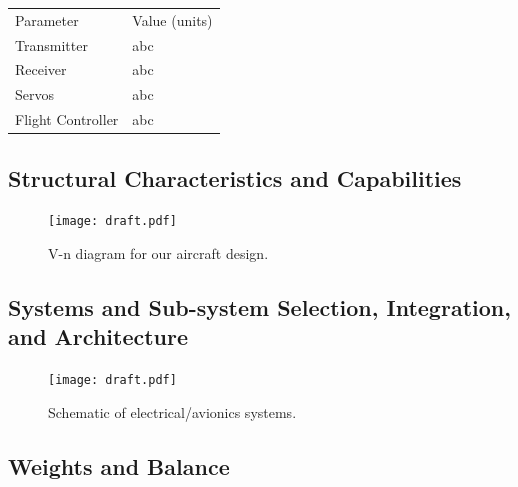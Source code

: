 \documentclass[report]{byu-aero}
\begin{document}
\begin{table}[h!]
\begin{subtable}[t]{0.3\textwidth}
\begin{tabular}{ C{1.1in} C{0.75in} }
		Parameter & Value (units)  \\

		Transmitter & abc  \\
		Receiver & abc  \\
		Servos & abc  \\
		Flight Controller & abc  \\
	\end{tabular}
\end{subtable}
\end{table}


\subsection{Structural Characteristics and Capabilities}
\label{ssec:structures}


\begin{figure}[h!]
	\centering
	\texttt{[image: draft.pdf]}
	\caption{V-n diagram for our aircraft design.}
	\label{fig:vndiagram}
\end{figure}



\subsection{Systems and Sub-system Selection, Integration, and Architecture}
\label{ssec:systemdetails}

\begin{figure}[h!]
	\centering
	\texttt{[image: draft.pdf]}
	\caption{Schematic of electrical/avionics systems.}
	\label{fig:schematic}
\end{figure}


\subsection{Weights and Balance}
\label{ssec:weightsandbalance}
\end{document}
